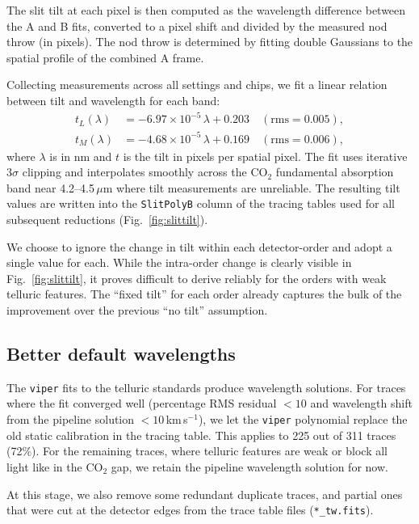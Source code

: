 \documentclass{aa}
\newcommand{\um}{$\mu$m}
\newcommand{\kms}{km\,s$^{-1}$}
\newcommand{\viper}{\texttt{viper}}
\begin{document}
The slit tilt at each pixel is then computed as the wavelength difference
between the A and B fits, converted to a pixel shift and divided by the
measured nod throw (in pixels). The nod throw is determined by fitting
double Gaussians to the spatial profile of the combined A frame.

Collecting measurements across all settings and chips, we fit a linear
relation between tilt and wavelength for each band:
\begin{align}
  t_L(\lambda) &= -6.97 \times 10^{-5}\,\lambda + 0.203 \quad
    (\mathrm{rms} = 0.005), \label{eq:tiltL} \\
  t_M(\lambda) &= -4.68 \times 10^{-5}\,\lambda + 0.169 \quad
    (\mathrm{rms} = 0.006), \label{eq:tiltM}
\end{align}
where $\lambda$ is in nm and $t$ is the tilt in pixels per spatial pixel.
The fit uses iterative 3$\sigma$ clipping and interpolates smoothly
across the CO$_2$ fundamental absorption band near 4.2--4.5\,\um{} where
tilt measurements are unreliable. The resulting tilt values are written
into the \texttt{SlitPolyB} column of the tracing tables used for all
subsequent reductions (Fig.~\ref{fig:slittilt}).

We choose to ignore the change in tilt within each detector-order
and adopt a single value for each. While the intra-order change is clearly
visible in Fig.~\ref{fig:slittilt}, it proves difficult to derive reliably for
the orders with weak telluric features. The ``fixed tilt'' for each
order already captures the bulk of the improvement over the previous 
``no tilt'' assumption.

\subsection{Better default wavelengths}
\label{sec:defaultwave}

The \viper{} fits to the telluric standards produce
wavelength solutions. For traces where the fit converged well
(percentage RMS residual $< 10$ and wavelength shift from the pipeline
solution $< 10$\,\kms), we let the \viper{} polynomial replace the old static
 calibration in the tracing table. This applies to 225 out of
311 traces (72\%). For the remaining traces, where telluric features are weak
or block all light like in the CO$_2$ gap, we retain
the pipeline wavelength solution for now.

At this stage, we also remove some redundant duplicate traces, and partial ones
that were cut at the detector edges from the trace table files (\texttt{*\_tw.fits}).
\end{document}
